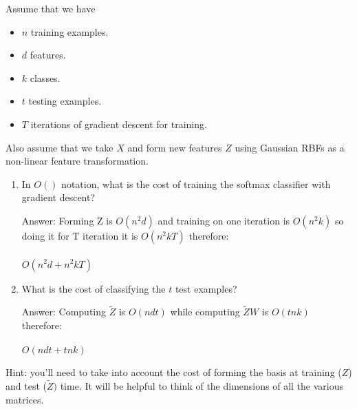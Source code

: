 \documentclass{article}
\newcommand{\blu}[1]{{\textcolor{blu}{#1}}}
\newcommand{\gre}[1]{\textcolor{gre}{#1}}
\newcommand\ans[1]{\par\gre{Answer: #1}}
\let\ask\blu
\begin{document}
Assume that we have
\begin{itemize}
    \item $n$ training examples.
    \item $d$ features.
    \item $k$ classes.
    \item $t$ testing examples.
    \item $T$ iterations of gradient descent for training.
\end{itemize}
Also assume that we take $X$ and form new features $Z$ using Gaussian RBFs as a non-linear feature transformation.
\begin{enumerate}
\item \ask{In $O()$ notation, what is the cost of training the softmax classifier with gradient descent?}
\ans{Forming Z is $O(n^2d)$ and training on one iteration is $O(n^2k)$ so doing it for T iteration it is $O(n^2kT)$ therefore:\\\\
$O(n^2d+n^2kT)$
}
\item \ask{What is the cost of classifying the $t$ test examples?}
\ans{Computing $\tilde{Z}$ is $O(ndt)$ while computing $\tilde{Z}W$ is $O(tnk)$ therefore:\\\\
$O(ndt+tnk)$
}
\end{enumerate}
Hint: you'll need to take into account the cost of forming the basis at training ($Z$) and test ($\tilde{Z})$ time. It will be helpful to think of the dimensions of all the various matrices.


\newpage
\clearpage
\end{document}
